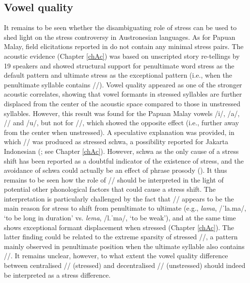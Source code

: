 \subsection{Vowel quality} \label{sec414}
It remains to be seen whether the disambiguating role of stress can be used to shed light on the stress controversy in Austronesian languages. As for Papuan Malay, field elicitations reported in \citet{kluge_grammar_2017} do not contain any minimal stress pairs. The acoustic evidence (Chapter \ref{chAc}) was based on unscripted story re-tellings by 19 speakers and showed structural support for penultimate word stress as the default pattern and ultimate stress as the exceptional pattern (i.e., when the penultimate syllable contains //). Vowel quality appeared as one of the stronger acoustic correlates, showing that vowel formants in stressed syllables are further displaced from the center of the acoustic space compared to those in unstressed syllables. However, this result was found for the Papuan Malay vowels /i/, /a/, // and /u/, but not for //, which showed the opposite effect (i.e., further away from the center when unstressed). A speculative explanation was provided, in which // was produced as stressed schwa, a possibility reported for Jakarta Indonesian (\citealt{laksman_location_1994}; see Chapter \ref{chAc}). However, schwa as the only cause of a stress shift has been reported as a doubtful indicator of the existence of stress, and the avoidance of schwa could actually be an effect of phrase prosody (\citealt[88]{goedemans_no_2014}). It thus remains to be seen how the role of // should be interpreted in the light of potential other phonological factors that could cause a stress shift. The interpretation is particularly challenged by the fact that // appears to be the main reason for stress to shift from penultimate to ultimate (e.g., \textit{lama}, /ˈla.ma/, `to be long in duration' vs. \textit{lema}, /l.ˈma/, `to be weak'), and at the same time shows exceptional formant displacement when stressed (Chapter \ref{chAc}). The latter finding could be related to the extreme sparsity of stressed //, a pattern mainly observed in penultimate position when the ultimate syllable also contains //. It remains unclear, however, to what extent the vowel quality difference between centralised // (stressed) and decentralised // (unstressed) should indeed be interpreted as a stress difference.\par

